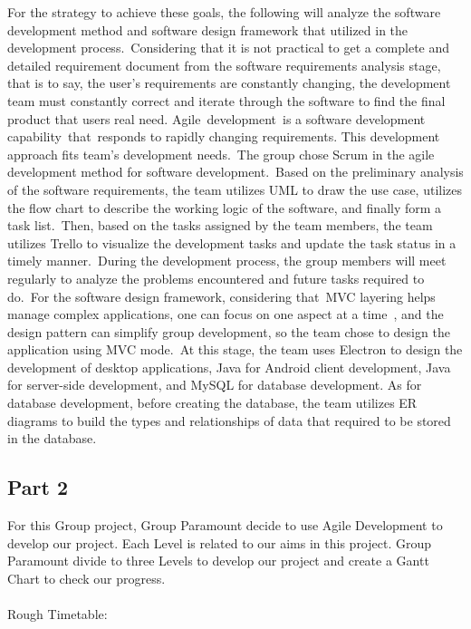 \documentclass{article}
\begin{document}
	For the strategy to achieve these goals, the following will analyze the software development method and software design framework that utilized in the development process. Considering that it is not practical to get a complete and detailed requirement document from the software requirements analysis stage, that is to say, the user's requirements are constantly changing, the development team must constantly correct and iterate through the software to find the final product that users real need. Agile development is a software development capability that responds to rapidly changing requirements. This development approach fits team’s development needs. The group chose Scrum in the agile development method for software development. Based on the preliminary analysis of the software requirements, the team utilizes UML to draw the use case, utilizes the flow chart to describe the working logic of the software, and finally form a task list. Then, based on the tasks assigned by the team members, the team utilizes Trello to visualize the development tasks and update the task status in a timely manner. During the development process, the group members will meet regularly to analyze the problems encountered and future tasks required to do. For the software design framework, considering that MVC layering helps manage complex applications, one can focus on one aspect at a time , and the design pattern can simplify group development, so the team chose to design the application using MVC mode. At this stage, the team uses Electron to design the development of desktop applications, Java for Android client development, Java for server-side development, and MySQL for database development. As for database development, before creating the database, the team utilizes ER diagrams to build the types and relationships of data that required to be stored in the database.
	
	\subsection{Part 2}
	
	For this Group project, Group Paramount decide to use Agile Development to develop our project. Each Level is related to our aims in this project. Group Paramount divide to three Levels to develop our project and create a Gantt Chart to check our progress.
	\\ \hspace*{\fill} \\
	Rough Timetable:
	
\end{document}
